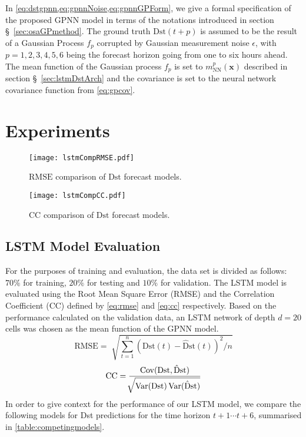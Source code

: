 In \cref{eq:dstgpnn,eq:gpnnNoise,eq:gpnnGPForm}, we give a formal specification of the proposed GPNN model in 
terms of the notations introduced in section \S~\ref{sec:osaGPmethod}. The ground truth $\mathrm{Dst}\left(t + p\right)$ 
is assumed to be the result of a Gaussian Process $f_{p}$ corrupted by Gaussian measurement noise $\epsilon$, 
with $p = {1,2,3,4,5,6}$ being the forecast horizon going from one to six hours ahead. The mean function of the 
Gaussian process $f_{p}$ is set to $m^{p}_{\text{NN}} \left( \mathbf{x} \right)$ described in 
section \S~\ref{sec:lstmDstArch} and the covariance is set to the neural network covariance function 
from \cref{eq:gpcov}. 


\section{Experiments} \label{sec:resultsgpnn}

\begin{figure}
	\texttt{[image: lstmCompRMSE.pdf]}
	\caption{$\mathrm{RMSE}$ comparison of $\mathrm{Dst}$ forecast models.}
	\label{fig:lstmRMSE}
\end{figure}

\begin{figure}
	\texttt{[image: lstmCompCC.pdf]}
	\caption{$\mathrm{CC}$ comparison of $\mathrm{Dst}$ forecast models.}
	\label{fig:lstmCC}
\end{figure}

\subsection{LSTM Model Evaluation}

For the purposes of training and evaluation, the data set is divided as follows: $70\%$ for training, $20\%$  
for testing and $10\%$ for validation. The LSTM model is evaluated using the Root Mean Square Error (RMSE) 
and the Correlation Coefficient (CC) defined by \cref{eq:rmse} and \cref{eq:cc} respectively. Based 
on the performance calculated on the validation data, an LSTM network of depth $d = 20$ cells was chosen as 
the mean function of the GPNN model.
%
\begin{equation}\label{eq:rmse}
 \mathrm{RMSE} = \sqrt[]{\sum_{t=1}^{n}\left( 
	 \mathrm{Dst} \left( t \right) - \mathrm{\hat{D}st}\left(t\right)
 \right) ^{2}/n}
\end{equation}
%
\begin{equation}\label{eq:cc}
 \mathrm{CC} = \frac{\operatorname*{Cov}(
	 \mathrm{Dst},\mathrm{\hat{D}st})}{
		 \sqrt[]{
			 \operatorname*{Var}(\mathrm{Dst}) \operatorname*{Var}(\mathrm{\hat{D}st})
		 }
	} 
\end{equation}
%
In order to give context for the performance of our LSTM model, we compare the following models for Dst predictions 
for the time horizon $t+1 \cdots t+6$, summarised in \cref{table:competingmodels}.

